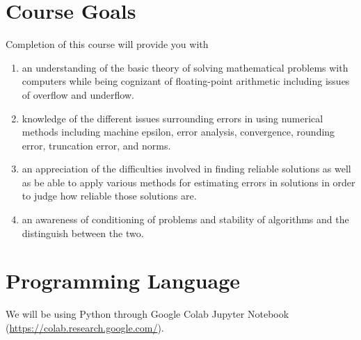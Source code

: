 \documentclass[letterpaper,10pt]{article}
\begin{document}

\section*{Course Goals}

Completion of this course will provide you with
\begin{enumerate}

\item an understanding of the basic theory of solving mathematical problems
with computers while being cognizant of floating-point arithmetic including
issues of overflow and underflow.

\item knowledge of the different issues surrounding errors in using numerical
methods including machine epsilon, error analysis, convergence, rounding error,
truncation error, and norms.

\item an appreciation of the difficulties involved in finding reliable
solutions as well as be able to apply various methods for estimating errors in
solutions in order to judge how reliable those solutions are.

\item an awareness of conditioning of problems and stability of algorithms and
the distinguish between the two.

\end{enumerate}

\section*{Programming Language}

We will be using Python through Google Colab Jupyter Notebook (\url{https://colab.research.google.com/}).

\end{document}
